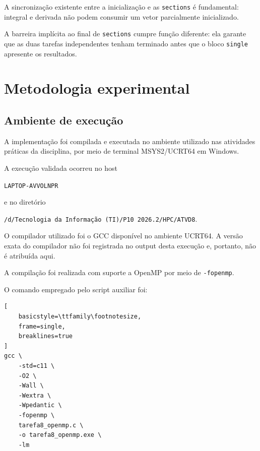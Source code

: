 A sincronização existente entre a inicialização e as \texttt{sections} é
fundamental: integral e derivada não podem consumir um vetor parcialmente
inicializado.

A barreira implícita ao final de \texttt{sections} cumpre função diferente:
ela garante que as duas tarefas independentes tenham terminado antes que o
bloco \texttt{single} apresente os resultados.


\section{Metodologia experimental}
\label{sec:atvd08-metodologia}

\subsection{Ambiente de execução}

A implementação foi compilada e executada no ambiente utilizado nas
atividades práticas da disciplina, por meio de terminal MSYS2/UCRT64 em
Windows.

A execução validada ocorreu no host

\begin{center}
\texttt{LAPTOP-AVVOLNPR}
\end{center}

e no diretório

\begin{center}
\texttt{/d/Tecnologia da Informação (TI)/P10 2026.2/HPC/ATVD8}.
\end{center}

O compilador utilizado foi o GCC disponível no ambiente UCRT64. A versão
exata do compilador não foi registrada no output desta execução e, portanto,
não é atribuída aqui.

A compilação foi realizada com suporte a OpenMP por meio de
\texttt{-fopenmp}.

O comando empregado pelo script auxiliar foi:

\begin{lstlisting}[
    basicstyle=\ttfamily\footnotesize,
    frame=single,
    breaklines=true
]
gcc \
    -std=c11 \
    -O2 \
    -Wall \
    -Wextra \
    -Wpedantic \
    -fopenmp \
    tarefa8_openmp.c \
    -o tarefa8_openmp.exe \
    -lm
\end{lstlisting}

